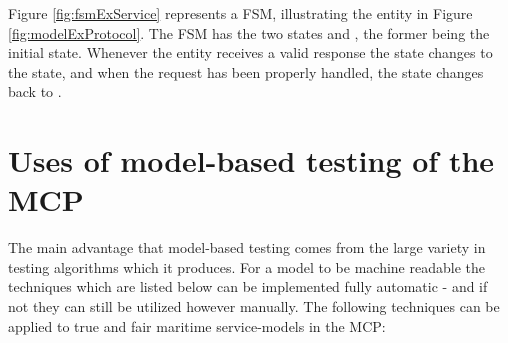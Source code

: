 Figure \ref{fig:fsmExService} represents a FSM, illustrating the  entity in Figure \ref{fig:modelExProtocol}. The FSM has the two states  and , the former being the initial state. Whenever the entity receives a valid response the state changes to the  state, and when the request has been properly handled, the state changes back to .

\section{Uses of model-based testing of the MCP}
The main advantage that model-based testing comes from the large variety in testing algorithms which it produces. For a model to be machine readable the techniques which are listed below can be implemented fully automatic - and if not they can still be utilized however manually. The following techniques can be applied to true and fair maritime service-models in the MCP:
